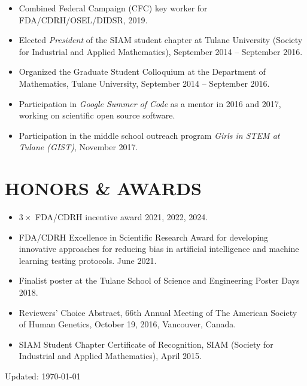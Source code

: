 \documentclass[overlapped, line, 10pt]{res} %
\begin{document}
\begin{resume}
\begin{itemize}
  \item Combined Federal Campaign (CFC) key worker for FDA/CDRH/OSEL/DIDSR, 2019.
  \item Elected {\it President} of the SIAM student chapter at Tulane University (Society for Industrial and Applied Mathematics), September 2014 -- September 2016.
  \item Organized the Graduate Student Colloquium at the Department of Mathematics, Tulane University, September 2014 -- September 2016.
  \item Participation in \emph{Google Summer of Code} as a mentor in 2016 and 2017, working on scientific open source software.
  \item Participation in the middle school outreach program \emph{Girls in STEM at Tulane (GIST)}, November 2017.
\end{itemize}


\section{HONORS \& AWARDS}

\begin{itemize}
  \item $3\times$ FDA/CDRH incentive award 2021, 2022, 2024.
  \item FDA/CDRH Excellence in Scientific Research Award for developing innovative approaches for reducing bias in artificial intelligence and machine learning testing protocols. June 2021.
  \item Finalist poster at the Tulane School of Science and Engineering Poster Days 2018.
  \item Reviewers’ Choice Abstract, 66th Annual Meeting of The American Society of Human Genetics, October 19, 2016, Vancouver, Canada.
  \item SIAM Student Chapter Certificate of Recognition, SIAM (Society for Industrial and Applied Mathematics), April 2015.
\end{itemize}

\vfill
\centerline{Updated: \today}


\end{resume}
\end{document}
